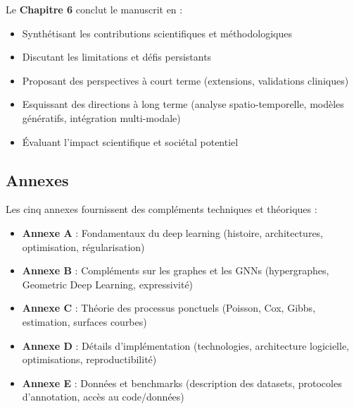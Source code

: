 Le \textbf{Chapitre 6} conclut le manuscrit en :
\begin{itemize}
    \item Synthétisant les contributions scientifiques et méthodologiques
    \item Discutant les limitations et défis persistants
    \item Proposant des perspectives à court terme (extensions, validations cliniques)
    \item Esquissant des directions à long terme (analyse spatio-temporelle, modèles génératifs, intégration multi-modale)
    \item Évaluant l'impact scientifique et sociétal potentiel
\end{itemize}

\subsection{Annexes}

Les cinq annexes fournissent des compléments techniques et théoriques :
\begin{itemize}
    \item \textbf{Annexe A} : Fondamentaux du deep learning (histoire, architectures, optimisation, régularisation)
    \item \textbf{Annexe B} : Compléments sur les graphes et les GNNs (hypergraphes, Geometric Deep Learning, expressivité)
    \item \textbf{Annexe C} : Théorie des processus ponctuels (Poisson, Cox, Gibbs, estimation, surfaces courbes)
    \item \textbf{Annexe D} : Détails d'implémentation (technologies, architecture logicielle, optimisations, reproductibilité)
    \item \textbf{Annexe E} : Données et benchmarks (description des datasets, protocoles d'annotation, accès au code/données)
\end{itemize}

